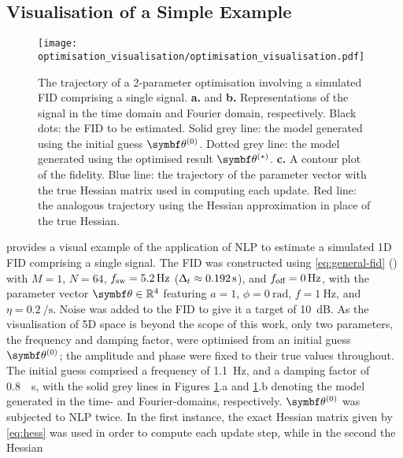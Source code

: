 \subsection{Visualisation of a Simple Example}
\label{subsec:optim-vis}
\begin{figure}
    \centering
    \texttt{[image: optimisation\_visualisation/optimisation\_visualisation.pdf]}
    \caption[
        The trajectory of a 2-parameter optimisation involving a simulated
        \acs{FID}.
    ]
    {
        The trajectory of a 2-parameter optimisation
        involving a simulated \acs{FID} comprising a single signal.
        \textbf{a.} and \textbf{b.} Representations of the signal in
        the time domain and Fourier domain, respectively.
        Black dots: the \ac{FID} to be estimated.
        Solid grey line: the model generated
        using the initial guess $\bthzero$.
        Dotted grey line: the model generated using the optimised result
        $\bthstar$.
        \textbf{c.} A contour plot of the fidelity.
        Blue line: the trajectory of the parameter vector with the true
        Hessian matrix used in computing each update.
        Red line: the analogous trajectory using the Hessian approximation
        in place of the true Hessian.
    }
    \label{fig:optim-vis}
\end{figure}
 provides a visual example of the application of \ac{NLP}
to estimate a simulated \ac{1D} \ac{FID} comprising a single signal.
The FID was constructed using \cref{eq:general-fid} ()
with $M=1$, $N = 64$, $f_{\mathrm{sw}} = \qty{5.2}{\hertz}$ ($\Updelta_t \approx
\qty{0.192}{\second}$), and $f_{\text{off}} = \qty{0}{\hertz}$, with the
parameter vector $\bth \in \mathbb{R}^4$ featuring $a=1$,
$\phi=\qty{0}{\radian}$, $f=\qty{1}{\hertz}$, and $\eta=\qty{0.2}{\per\second}$.
Noise was added to the \ac{FID} to give it a target  of
\qty{10}{\deci\bel}. As the visualisation of 5D space is beyond the scope of
this work, only two parameters, the frequency and damping factor, were optimised
from an initial guess $\bthzero$; the amplitude and phase were fixed to
their true values throughout. The initial guess comprised a frequency of
\qty{1.1}{\hertz}, and a damping factor of \qty{0.8}{\per\second}, with the
solid grey lines in Figures \ref{fig:optim-vis}.a and \ref{fig:optim-vis}.b
denoting the model generated in the time- and
Fourier-domains, respectively. $\bthzero$ was subjected to \ac{NLP} twice. In
the first instance, the exact Hessian matrix given by \cref{eq:hess} was used
in order to compute each update step, while in the second the Hessian
